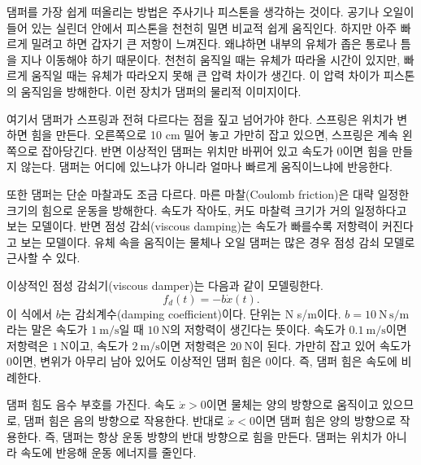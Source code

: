 댐퍼를 가장 쉽게 떠올리는 방법은 주사기나 피스톤을 생각하는 것이다.
공기나 오일이 들어 있는 실린더 안에서 피스톤을 천천히 밀면 비교적 쉽게 움직인다.
하지만 아주 빠르게 밀려고 하면 갑자기 큰 저항이 느껴진다.
왜냐하면 내부의 유체가 좁은 통로나 틈을 지나 이동해야 하기 때문이다.
천천히 움직일 때는 유체가 따라올 시간이 있지만, 빠르게 움직일 때는 유체가 따라오지 못해 큰 압력 차이가 생긴다.
이 압력 차이가 피스톤의 움직임을 방해한다.
이런 장치가 댐퍼의 물리적 이미지이다.

여기서 댐퍼가 스프링과 전혀 다르다는 점을 짚고 넘어가야 한다.
스프링은 위치가 변하면 힘을 만든다.
오른쪽으로 10 cm 밀어 놓고 가만히 잡고 있으면, 스프링은 계속 왼쪽으로 잡아당긴다.
반면 이상적인 댐퍼는 위치만 바뀌어 있고 속도가 0이면 힘을 만들지 않는다.
댐퍼는 어디에 있느냐가 아니라 얼마나 빠르게 움직이느냐에 반응한다.

또한 댐퍼는 단순 마찰과도 조금 다르다.
마른 마찰(Coulomb friction)은 대략 일정한 크기의 힘으로 운동을 방해한다.
속도가 작아도, 커도 마찰력 크기가 거의 일정하다고 보는 모델이다.
반면 점성 감쇠(viscous damping)는 속도가 빠를수록 저항력이 커진다고 보는 모델이다.
유체 속을 움직이는 물체나 오일 댐퍼는 많은 경우 점성 감쇠 모델로 근사할 수 있다.

이상적인 점성 감쇠기(viscous damper)는 다음과 같이 모델링한다.
\begin{equation}
  f_d(t)=-b\dot{x}(t).
  \label{eq:damper_force}
\end{equation}
이 식에서 $b$는 감쇠계수(damping coefficient)이다.
단위는 N s/m이다.
$b=10~\mathrm{N\,s/m}$라는 말은 속도가 $1~\mathrm{m/s}$일 때 $10~\mathrm{N}$의 저항력이 생긴다는 뜻이다.
속도가 $0.1~\mathrm{m/s}$이면 저항력은 $1~\mathrm{N}$이고, 속도가 $2~\mathrm{m/s}$이면 저항력은 $20~\mathrm{N}$이 된다.
가만히 잡고 있어 속도가 0이면, 변위가 아무리 남아 있어도 이상적인 댐퍼 힘은 0이다.
즉, 댐퍼 힘은 속도에 비례한다.

댐퍼 힘도 음수 부호를 가진다.
속도 $\dot{x}>0$이면 물체는 양의 방향으로 움직이고 있으므로, 댐퍼 힘은 음의 방향으로 작용한다.
반대로 $\dot{x}<0$이면 댐퍼 힘은 양의 방향으로 작용한다.
즉, 댐퍼는 항상 운동 방향의 반대 방향으로 힘을 만든다.
댐퍼는 위치가 아니라 속도에 반응해 운동 에너지를 줄인다.

